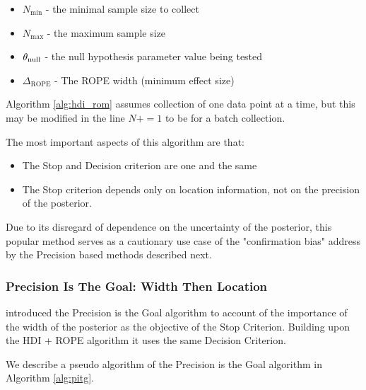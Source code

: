 \begin{itemize}
    \item $N_\mathrm{min}$ - the minimal sample size to collect
    \item $N_\mathrm{max}$ - the maximum sample size
    \item $\theta_{\rm null}$ - the null hypothesis parameter value being tested
    \item $\Delta_\mathrm{ROPE}$ - The ROPE width (minimum effect size)
\end{itemize}

Algorithm \ref{alg:hdi_rom} assumes collection of one data point at a time,
but this may be modified in the line $N += 1$ to be for a batch collection.

The most important aspects of this algorithm are that:

\begin{itemize}
    \item The Stop and Decision criterion are one and the same
    \item The Stop criterion depends only on location information, not on the precision of the posterior.
\end{itemize}

Due to its disregard of dependence on the uncertainty of the posterior,
this popular method serves as a cautionary use case of the "confirmation bias"
address by the Precision based methods described next.


\subsubsection{Precision Is The Goal: Width Then Location}

\cite{kruschke2015doing} introduced the Precision is the Goal algorithm to account
of the importance of the width of the posterior as the objective of the Stop Criterion.
Building upon the HDI + ROPE algorithm it uses the same Decision Criterion.

We describe a pseudo algorithm of the Precision is the Goal algorithm in Algorithm \ref{alg:pitg}.

